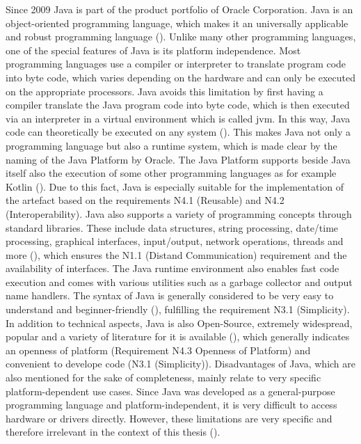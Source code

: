 Since 2009 Java is part of the product portfolio of Oracle Corporation. Java is an object-oriented programming language, which makes it an universally applicable and robust programming language (\cite{Ullenboom.2017}). Unlike many other programming languages, one of the special features of Java is its platform independence. Most programming languages use a compiler or interpreter to translate program code into byte code, which varies depending on the hardware and can only be executed on the appropriate processors. Java avoids this limitation by first having a compiler translate the Java program code into byte code, which is then executed via an interpreter in a virtual environment which is called \ac{jvm}. In this way, Java code can theoretically be executed on any system (\cite{Ullenboom.2017}). This makes Java not only a programming language but also a runtime system, which is made clear by the naming of the Java Platform by Oracle. The Java Platform supports beside Java itself also the execution of some other programming languages as for example Kotlin (\cite{kotlinlang.2023}). Due to this fact, Java is especially suitable for the implementation of the artefact based on the requirements N4.1 (Reusable) and N4.2 (Interoperability). Java also supports a variety of programming concepts through standard libraries. These include data structures, string processing, date/time processing, graphical interfaces, input/output, network operations, threads and more (\cite{Ullenboom.2017}), which ensures the N1.1 (Distand Communication) requirement and the availability of interfaces. The Java runtime environment also enables fast code execution and comes with various utilities such as a garbage collector and output name handlers. The syntax of Java is generally considered to be very easy to understand and beginner-friendly (\cite{Ullenboom.2017}), fulfilling the requirement N3.1 (Simplicity). In addition to technical aspects, Java is also Open-Source, extremely widespread, popular and a variety of literature for it is available (\cite{Ullenboom.2017}), which generally indicates an openness of platform (Requirement N4.3 Openness of Platform) and convenient to develope code (N3.1 (Simplicity)). Disadvantages of Java, which are also mentioned for the sake of completeness, mainly relate to very specific platform-dependent use cases. Since Java was developed as a general-purpose programming language and platform-independent, it is very difficult to access hardware or drivers directly. However, these limitations are very specific and therefore irrelevant in the context of this thesis (\cite{Ullenboom.2017}). 


